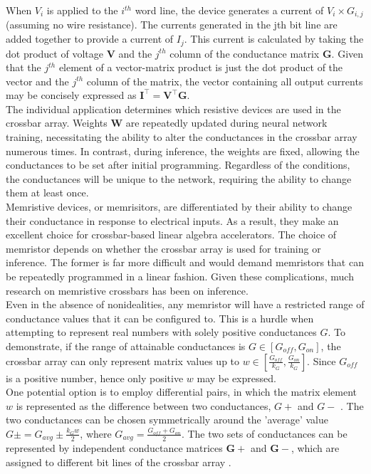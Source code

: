 \noindent When $V_i$ is applied to the $i^{th}$ word line, the device generates a current of $V_i \times G_{i,j}$ (assuming no wire resistance). The currents generated in the jth bit line are added together to provide a current of $I_j$. This current is calculated by taking the dot product of voltage $\mathbf{V}$ and the $j^{th}$ column of the conductance matrix $\mathbf{G}$. Given that the $j^{th}$ element of a vector-matrix product is just the dot product of the vector and the $j^{th}$ column of the matrix, the vector containing all output currents may be concisely expressed as $\mathbf{I}^\intercal = \mathbf{V}^\intercal \mathbf{G}$. \\
    
\noindent The individual application determines which resistive devices are used in the crossbar array. Weights $\mathbf{W}$ are repeatedly updated during neural network training, necessitating the ability to alter the conductances in the crossbar array numerous times. In contrast, during inference, the weights are fixed, allowing the conductances to be set after initial programming. Regardless of the conditions, the conductances will be unique to the network, requiring the ability to change them at least once. \\
    
\noindent Memristive devices, or memrisitors, are differentiated by their ability to change their conductance in response to electrical inputs. As a result, they make an excellent choice for crossbar-based linear algebra accelerators. The choice of memristor depends on whether the crossbar array is used for training or inference. The former is far more difficult and would demand memristors that can be repeatedly programmed in a linear fashion. Given these complications, much research on memristive crossbars has been on inference. \\
    
\noindent Even in the absence of nonidealities, any memristor will have a restricted range of conductance values that it can be configured to. This is a hurdle when attempting to represent real numbers with solely positive conductances $G$. To demonstrate, if the range of attainable conductances is $G \in [G_{off}, G_{on}]$, the crossbar array can only represent matrix values up to $w \in \left [ \frac{G_{off}}{k_G}, \frac{G_{on}}{k_G} \right ]$. Since $G_{off}$ is a positive number, hence only positive $w$ may be expressed. \\
    
\noindent One potential option is to employ differential pairs, in which the matrix element $w$ is represented as the difference between two conductances, $G+$ and $G-$ \cite{joksas2022nonideality}. The two conductances can be chosen symmetrically around the 'average' value $G \pm = G_{avg} \pm \frac{k_G w}{2}$, where $G_{avg} = \frac{G_{off} + G_{on}}{2}$. The two sets of conductances can be represented by independent conductance matrices $\mathbf{G}+$ and $\mathbf{G}-$, which are assigned to different bit lines of the crossbar array \cite{kim20214k}. \\
    
